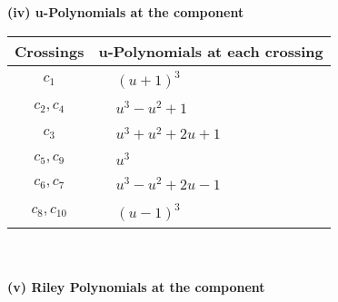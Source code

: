 \documentclass[1p]{elsarticle_modified}
\theoremstyle{definition}
\begin{document}
\newpage\renewcommand{\arraystretch}{1}
\flushleft \textbf{(iv) u-Polynomials at the component}\newline \\
\begin{tabular}{m{50pt}|m{274pt}}
Crossings & \hspace{64pt}u-Polynomials at each crossing \\
\hline $$\begin{aligned}c_{1}\end{aligned}$$&$\begin{aligned}
&(u+1)^3
\end{aligned}$\\
\hline $$\begin{aligned}c_{2},c_{4}\end{aligned}$$&$\begin{aligned}
&u^3- u^2+1
\end{aligned}$\\
\hline $$\begin{aligned}c_{3}\end{aligned}$$&$\begin{aligned}
&u^3+u^2+2 u+1
\end{aligned}$\\
\hline $$\begin{aligned}c_{5},c_{9}\end{aligned}$$&$\begin{aligned}
&u^3
\end{aligned}$\\
\hline $$\begin{aligned}c_{6},c_{7}\end{aligned}$$&$\begin{aligned}
&u^3- u^2+2 u-1
\end{aligned}$\\
\hline $$\begin{aligned}c_{8},c_{10}\end{aligned}$$&$\begin{aligned}
&(u-1)^3
\end{aligned}$\\
\hline
\end{tabular}\\~\\
\newpage\renewcommand{\arraystretch}{1}
\flushleft \textbf{(v) Riley Polynomials at the component}\newline \\
\end{document}
